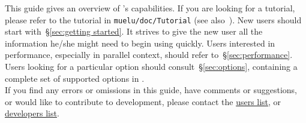 This guide gives an overview of \muelu{}'s capabilities.  If you are looking for
a tutorial, please refer to the \muelu{} tutorial in \verb!muelu/doc/Tutorial!
(see also~\cite{MueLuTutorial}). New users should start with~\S\ref{sec:getting
started}. It strives to give the new user all the information he/she might need
to begin using \muelu{} quickly. Users interested in performance, especially in
parallel context, should refer to~\S\ref{sec:performance}.  Users looking for a
particular option should consult~\S\ref{sec:options}, containing a complete set of
supported options in \muelu{}. \\

\noindent
If you find any errors or omissions in this guide, have comments or suggestions,
or would like to contribute to \muelu{} development, please contact the \muelu{}
\href{mailto:muelu-users@software.sandia.gov}{users list}, or
\href{mailto:muelu-developers@software.sandia.gov}{developers list}.
